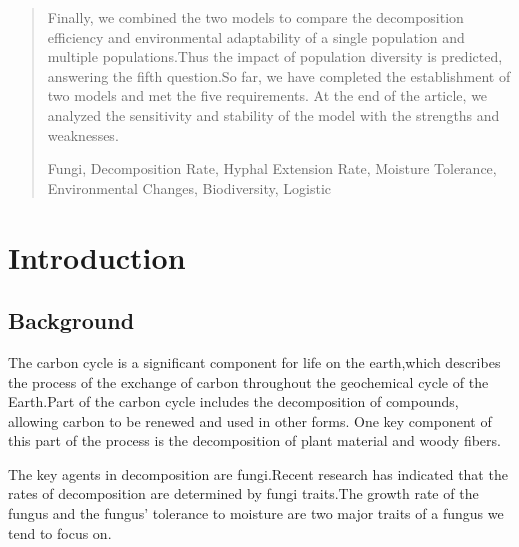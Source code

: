 \documentclass{mcmthesis}
\begin{document}
\begin{abstract}
Finally, we combined the two models to compare the decomposition efficiency and environmental adaptability of a single population and multiple populations.Thus the impact of population diversity is predicted, answering the fifth question.So far, we have completed the establishment of two models and met the five requirements. At the end of the article, we analyzed the sensitivity and stability of the model with the strengths and weaknesses.
\begin{keywords}
	Fungi, Decomposition Rate, Hyphal Extension Rate, Moisture Tolerance, Environmental Changes, Biodiversity, Logistic
\end{keywords}
\end{abstract}
\maketitle
\newpage                                                          %
\begin{adjustwidth}{-1cm}{0cm}

\setcounter{tocdepth}{3}
\thispagestyle{empty}
\tableofcontents                                                  %

\end{adjustwidth}


\newpage

\pagestyle{fancy}

\setcounter{page}{1}
\section{Introduction}
\subsection{Background}

The carbon cycle is a significant component for life on the earth,which describes the process of the exchange of carbon throughout the geochemical cycle of the Earth.Part of the carbon cycle includes the decomposition of compounds, allowing carbon to be renewed and used in other forms. One key component of this part of the process is the decomposition of plant material and woody fibers.

The key agents in decomposition are fungi.Recent research has indicated that the rates of decomposition are determined by fungi traits.The growth rate of the fungus and the fungus’ tolerance to moisture are two major traits of a fungus we tend to focus on.
\end{document}
